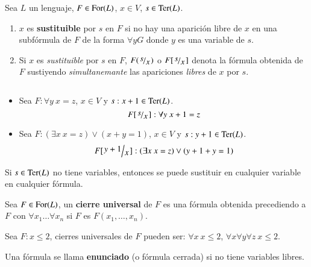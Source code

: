 \begin{dfn}
    Sea $L$ un lenguaje, $F \in \mathrm{For}(L)$, $x \in V$, $s \in \mathrm{Ter}(L)$.
    \begin{enumerate}
        \item $x$ es \textbf{sustituible} por $s$ en $F$ si no hay una aparición libre de $x$ en una subfórmula de $F$ de la forma $\forall y G$ donde $y$ es una variable de $s$.
        \item Si $x$ es \textit{sustituible} por $s$ en $F$, $F(\quo{s}{x})$ o $F[\quo{s}{x}]$ denota la fórmula obtenida de $F$ sustiyendo \textit{simultanemante} las apariciones \textit{libres} de $x$ por $s$.
    \end{enumerate}
\end{dfn}

\begin{eg}$ $
    \begin{itemize}
        \item Sea $F: \forall y\ x = z$, $x \in V$ y $s: x+1 \in \mathrm{Ter}(L)$.\\
        $$
            F[\quo{s}{x}]: \forall y\ x+1 = z
        $$
        \item Sea $F: (\exists x\ x=z) \lor (x+y=1)$, $x \in V$ y $s: y+1 \in \mathrm{Ter}(L)$.\\
        $$
            F[\quo{y+1}{x}]: (\exists x\ x=z) \lor (y+1+y=1)
        $$
    \end{itemize}
\end{eg}

\begin{obs}
    Si $s \in \mathrm{Ter}(L)$ no tiene variables, entonces se puede sustituir en cualquier variable en cualquier fórmula.
\end{obs}

\begin{dfn}
    Sea $F \in \mathrm{For}(L)$, un \textbf{cierre universal} de $F$ es una fórmula obtenida precediendo a $F$ con $\forall x_1 \ldots \forall x_n$ si $F$ es $F(x_1, \ldots, x_n)$.
\end{dfn}

\begin{eg}
    Sea $F: x \leq 2$, cierres universales de $F$ pueden ser: $\forall x\ x\leq 2$, $\forall x \forall y \forall z\ x \leq 2$.
\end{eg}

\begin{dfn}[Enunciado]
    Una fórmula se llama \textbf{enunciado} (o fórmula cerrada) si no tiene variables libres.
\end{dfn}

